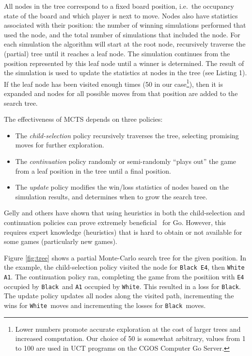 \documentclass{acm_proc_article-sp}
\newcommand{\hblack}{\texttt{Black}}
\newcommand{\hwhite}{\texttt{White}}
\begin{document}
All nodes in the tree correspond to a fixed board position, i.e.~the occupancy state of the board and which player is next to move. 
Nodes also have statistics associated with their position:  the number of winning simulations performed that used the node, and the total number of simulations that included the node. 
For each simulation the algorithm will start at the root node, recursively traverse the (partial) tree until it reaches a leaf node.
The simulation continues from the position represented by this leaf node until a winner is determined.
The result of the simulation is used to update the statistics at nodes in the tree
(see Listing 1).
If the leaf node has been visited enough times (50 in our case\footnote{Lower numbers promote accurate exploration at the cost of larger trees and increased computation. Our choice of 50 is somewhat arbitrary, values from 1 to 100 are used in UCT programs on the CGOS Computer Go Server\cite{cgosbots}.}), then it is expanded and nodes for all possible moves from 
that position are added to the search tree.

The effectiveness of MCTS depends on three policies:
\begin{itemize}
\item{The \emph{child-selection} policy recursively traverses the tree, selecting promising moves for further exploration.}
\item{The \emph{continuation} policy randomly or semi-randomly ``plays out'' the game from a leaf position in the tree until a final position.}
\item{The \emph{update} policy modifies the win/loss statistics of nodes based on the simulation results, and determines when to grow the search tree.}
\end{itemize}

Gelly and others have shown that using heuristics in both the child-selection and continuation policies 
can prove extremely beneficial~\cite{gelly2006modification,gelly2008achieving} for Go.
However, this requires expert knowledge (heuristics) that is hard to obtain or not available for some games (particularly new games). 

Figure \ref{fig:tree} shows a partial Monte-Carlo search tree for the given position. In the example, the child-selection policy visited the node for \texttt{Black E4}, then \texttt{White A1}. 
The continuation policy ran, completing the game from the positiion with \texttt{E4} occupied by \hblack\ and \texttt{A1} occupied by \hwhite.
This resulted in a loss for \hblack. 
The update policy updates all nodes along the visited path, incrementing the wins for \hwhite\ moves and incrementing the losses for \hblack\ moves.
\end{document}
